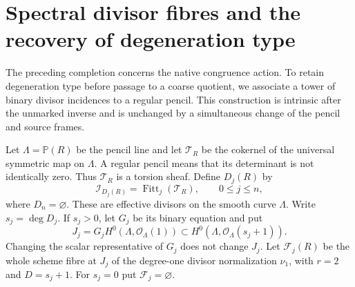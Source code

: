 \documentclass[11pt,reqno]{amsart}
\numberwithin{equation}{section}
\theoremstyle{definition}\newtheorem{definition}[theorem]{Definition}
\theoremstyle{remark}\newtheorem{remark}[theorem]{Remark}
\newcommand{\Pj}{\mathbb P}\newcommand{\A}{\mathbb A}
\newcommand{\OO}{\mathcal O}\newcommand{\II}{\mathcal I}
\DeclareMathOperator{\Fitt}{Fitt}\DeclareMathOperator{\Ann}{Ann}
\begin{document}
\section{Spectral divisor fibres and the recovery of degeneration type}
\label{sec:spectral-divisor-v154}
The preceding completion concerns the native congruence action. To
retain degeneration type before passage to a coarse quotient, we
associate a tower of binary divisor incidences to a regular pencil.
This construction is intrinsic after the unmarked inverse and is
unchanged by a simultaneous change of the pencil and source frames.

Let $\Lambda=\Pj(R)$ be the pencil line and let
$\mathcal T_R$ be the cokernel of the universal symmetric map on
$\Lambda$. A regular pencil means that its determinant is not
identically zero. Thus $\mathcal T_R$ is a torsion sheaf. Define
$D_j(R)$ by
\begin{equation}\label{eq:spectral-Fitting-v154}
 \II_{D_j(R)}=\Fitt_j(\mathcal T_R),\qquad 0\leq j\leq n,
\end{equation}
where $D_n=\varnothing$. These are effective divisors on the smooth
curve $\Lambda$. Write $s_j=\deg D_j$. If $s_j>0$, let $G_j$ be
its binary equation and put
\[
 J_j=G_j H^0(\Lambda,\OO_\Lambda(1))
       \subset H^0(\Lambda,\OO_\Lambda(s_j+1)).
\]
Changing the scalar representative of $G_j$ does not change $J_j$.
Let $\mathcal F_j(R)$ be the whole scheme fibre at $J_j$ of the
degree-one divisor normalization $\nu_1$, with $r=2$ and $D=s_j+1$.
For $s_j=0$ put $\mathcal F_j=\varnothing$.
\end{document}
